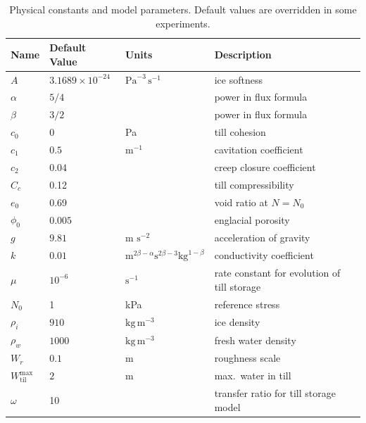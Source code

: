 \documentclass[11pt,final]{amsart}
\newcommand{\Wtilmax}{W_{\text{til}}^{\text{max}}}
\begin{document}
\begin{table}[ht]
  \centering
  \caption{Physical constants and model parameters.  Default values are overridden in some experiments.}
  \begin{tabular}{lllp{3.0in}} 
    \textbf{Name} & \textbf{Default Value} & \textbf{Units} & \textbf{Description}\\
\hline
    $A$ & $3.1689\times 10^{-24}$ & $\text{Pa}^{-3}\,\text{s}^{-1}$ & ice softness \citep{EISMINT96} \phantom{$\Big|$} \\
    $\alpha$ & $5/4$ & & power in flux formula  \citep{Hewittetal2012} \\
    $\beta$ & $3/2$ & & power in flux formula  \citep{Hewittetal2012} \\
    $c_0$ & 0 & Pa & till cohesion \citep{Tulaczyketal2000} \\
    $c_1$ & $0.5$ & $\text{m}^{-1}$ & cavitation coefficient \\
    $c_2$ & $0.04$ & & creep closure coefficient \\
    $C_c$ & 0.12 &  & till compressibility \citep{Tulaczyketal2000} \\
    $e_0$ & 0.69 &  & void ratio at $N=N_0$ \citep{Tulaczyketal2000} \\
    $\phi_0$ & $0.005$ & & englacial porosity \citep{Bartholomausetal2011} \\
    $g$ & $9.81$ & m $\text{s}^{-2}$ & acceleration of gravity \\
    $k$ & $0.01$ & $\text{m}^{2\beta-\alpha} \text{s}^{2\beta-3} \text{kg}^{1-\beta}$ & conductivity coefficient  \citep{Hewittetal2012} \\
    $\mu$ & $10^{-6}$ & $\text{s}^{-1}$ & rate constant for evolution of till storage \\
    $N_0$ & 1 & kPa & reference stress \citep{Tulaczyketal2000} \\
    $\rho_i$ & $910$ & $\text{kg}\,\text{m}^{-3}$ & ice density \citep{GreveBlatter2009} \\
    $\rho_w$ & $1000$ & $\text{kg}\,\text{m}^{-3}$ & fresh water density \citep{GreveBlatter2009} \\
    $W_r$ & $0.1$ & $\text{m}$ & roughness scale \citep{Hewittetal2012} \\
    $\Wtilmax$ & $2\phantom{\Big|}$ & $\text{m}$ & max.~water in till \citep{BBssasliding} \\
    $\omega$ & 10 & & transfer ratio for till storage model \\
    \hline
  \end{tabular}
 \label{tab:constants}
\end{table}
\end{document}
